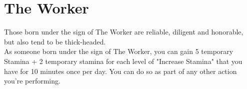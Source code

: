 \section{The Worker}\label{zodiac:worker}

Those born under the sign of The Worker are reliable, diligent and honorable, but also tend to be thick-headed.\\
As someone born under the sign of The Worker, you can gain 5 temporary Stamina + 2 temporary stamina for each level of "Increase Stamina" that you have for 10 minutes once per day.
You can do so as part of any other action you're performing.\\
